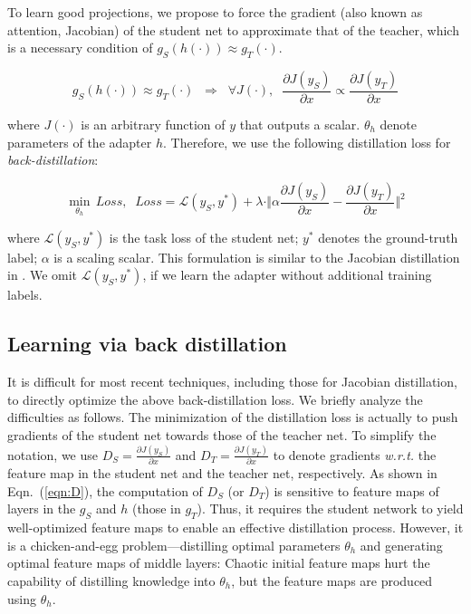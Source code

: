 \documentclass[10pt,twocolumn,letterpaper]{article}
\begin{document}
To learn good projections, we propose to force the gradient (also known as attention, Jacobian) of the student net to approximate that of the teacher, which is a necessary condition of {\small$g_{S}(h(\cdot))\!\approx\!g_{T}(\cdot)$}.
\begin{small}
\begin{equation}
g_{S}(h(\cdot))\approx g_{T}(\cdot) \;\;\Longrightarrow\;\; \forall J(\cdot),\;\;\frac{\partial J(y_{S})}{\partial x}\propto \frac{\partial J(y_{T})}{\partial x}
\label{eqn:equal}
\end{equation}
\end{small}
where $J(\cdot)$ is an arbitrary function of $y$ that outputs a scalar. $\theta_{h}$ denote parameters of the adapter $h$. Therefore, we use the following distillation loss for \textit{back-distillation}:
\begin{small}
\begin{equation}
\!\underset{\theta_{h}}{\min}\,Loss,\;\; Loss=\mathcal{L}(y_{S},y^{*})+\lambda\cdot\Vert\alpha\frac{\partial J(y_{S})}{\partial x}\!-\!\frac{\partial J(y_{T})}{\partial x}\Vert^2\!\!
\end{equation}
\end{small}
where {\small$\mathcal{L}(y_{S},y^{*})$} is the task loss of the student net; {\small$y^{*}$} denotes the ground-truth label; $\alpha$ is a scaling scalar. This formulation is similar to the Jacobian distillation in \cite{distillJacobian}. We omit {\small$\mathcal{L}(y_{S},y^{*})$}, if we learn the adapter without additional training labels.

\subsection{Learning via back distillation}
\label{sec:backDistill}

It is difficult for most recent techniques, including those for Jacobian distillation\textcolor{red}{\footnotemark[1]}, to directly optimize the above back-distillation loss. We briefly analyze the difficulties as follows. The minimization of the distillation loss is actually to push gradients of the student net towards those of the teacher net. To simplify the notation, we use {\small$D_{S}=\frac{\partial J(y_{S})}{\partial x}$} and {\small$D_{T}=\frac{\partial J(y_{T})}{\partial x}$} to denote gradients \emph{w.r.t.} the feature map in the student net and the teacher net, respectively. As shown in Eqn.~(\ref{eqn:D}), the computation of {\small$D_{S}$} (or {\small$D_{T}$}) is sensitive to feature maps of layers in the {\small$g_{S}$ and $h$} (those in {\small$g_{T}$}). Thus, it requires the student network to yield well-optimized feature maps to enable an effective distillation process. However, it is a chicken-and-egg problem---distilling optimal parameters {\small$\theta_{h}$} and generating optimal feature maps of middle layers: Chaotic initial feature maps hurt the capability of distilling knowledge into {\small$\theta_{h}$}, but the feature maps are produced using {\small$\theta_{h}$}.
\end{document}

